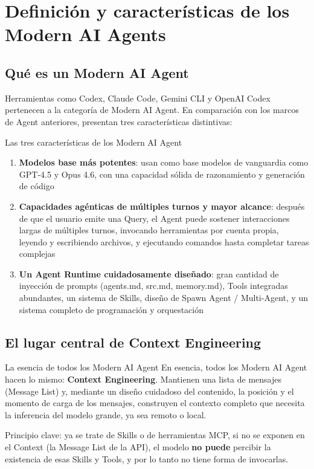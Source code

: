 \section{Definición y características de los Modern AI Agents}

\subsection{Qué es un Modern AI Agent}

Herramientas como Codex, Claude Code, Gemini CLI y OpenAI Codex pertenecen a la categoría de Modern AI Agent. En comparación con los marcos de Agent anteriores, presentan tres características distintivas:

\begin{importantbox}{Las tres características de los Modern AI Agent}
\begin{enumerate}
    \item \textbf{Modelos base más potentes}: usan como base modelos de vanguardia como GPT-4.5 y Opus 4.6, con una capacidad sólida de razonamiento y generación de código
    \item \textbf{Capacidades agénticas de múltiples turnos y mayor alcance}: después de que el usuario emite una Query, el Agent puede sostener interacciones largas de múltiples turnos, invocando herramientas por cuenta propia, leyendo y escribiendo archivos, y ejecutando comandos hasta completar tareas complejas
    \item \textbf{Un Agent Runtime cuidadosamente diseñado}: gran cantidad de inyección de prompts (agents.md, src.md, memory.md), Tools integradas abundantes, un sistema de Skills, diseño de Spawn Agent / Multi-Agent, y un sistema completo de programación y orquestación
\end{enumerate}
\end{importantbox}

\subsection{El lugar central de Context Engineering}

\begin{importantbox}{La esencia de todos los Modern AI Agent}
En esencia, todos los Modern AI Agent hacen lo mismo: \textbf{Context Engineering}. Mantienen una lista de mensajes (Message List) y, mediante un diseño cuidadoso del contenido, la posición y el momento de carga de los mensajes, construyen el contexto completo que necesita la inferencia del modelo grande, ya sea remoto o local.

Principio clave: ya se trate de Skills o de herramientas MCP, si no se exponen en el Context (la Message List de la API), el modelo \textbf{no puede} percibir la existencia de esas Skills y Tools, y por lo tanto no tiene forma de invocarlas.
\end{importantbox}

